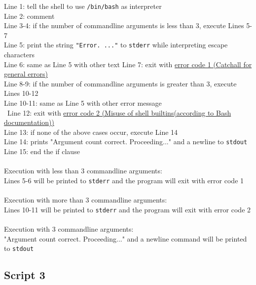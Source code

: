 \documentclass[11pt]{article} %
\begin{document}

Line 1: tell the shell to use \texttt{/bin/bash} as interpreter\\
Line 2: comment\\
Line 3-4: if the number of commandline arguments is less than 3, execute Lines 5-7\\
Line 5: print the string \texttt{"Error. ..."} to \texttt{stderr} while
interpreting escape characters\\
Line 6: same as Line 5 with other text
Line 7: exit with \href{http://www.tldp.org/LDP/abs/html/exitcodes.html}{error code 1
 (Catchall for general errors)}\\
Line 8-9: if the number of commandline arguments is greater than 3, execute Lines 10-12\\
Line 10-11: same as Line 5 with other error message\\\
Line 12: exit with \href{http://www.tldp.org/LDP/abs/html/exitcodes.html}{error
 code 2 (Misuse of shell builtins(according to Bash documentation))}\\
Line 13: if none of the above cases occur, execute Line 14\\
Line 14: prints "Argument count correct. Proceeding..." and a newline to \texttt{stdout}\\
Line 15: end the if clause\\
\\
Execution with less than 3 commandline arguments:\\
Lines 5-6 will be printed to \texttt{stderr} and the program will exit with error code 1\\
\\
Execution with more than 3 commandline arguments:\\
Lines 10-11 will be printed to \texttt{stderr} and the program will exit with error code 2\\
\\
Execution with 3 commandline arguments:\\
"Argument count correct. Proceeding..." and a newline command will be printed to \texttt{stdout}\\
\pagebreak
\subsection{Script 3}
\end{document}
